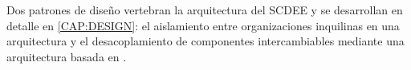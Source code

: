 Dos patrones de diseño vertebran la arquitectura del SCDEE y se desarrollan
en detalle en \cref{CAP:DESIGN}: el aislamiento entre organizaciones
inquilinas en una arquitectura  y el desacoplamiento de
componentes intercambiables mediante una arquitectura basada en
.
